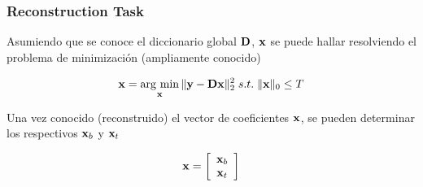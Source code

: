 \documentclass[spanish,xcolor=dvipsnames]{beamer}
\DeclareMathOperator*{\argmin}{arg\ min}
\begin{document}
\begin{frame}
	\frametitle{Reconstruction Task}

Asumiendo que se conoce el diccionario global ${\bf D}$, ${\bf x}$ se puede hallar resolviendo el problema de minimización (ampliamente conocido)

	\begin {equation}
		\nonumber {\bf x}=\argmin_{\bf x}\|{\bf y}-{\bf Dx}\|_2^2 \; s.t. \; \|{\bf x}\|_0 \leq T
	\end {equation}

Una vez conocido (reconstruido) el vector de coeficientes ${\bf x}$, se pueden determinar los respectivos ${\bf x}_b$ y ${\bf x}_t$

	\begin {equation}
		\nonumber	{\bf x}=
		\left[
		\begin {array}{c}
		{\bf x}_b \\ {\bf x}_t
		\end {array} 
		\right]
	\end {equation}

\end{frame}	


\end{document}
